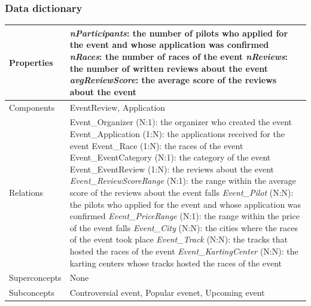 \documentclass{beamer}
\begin{document}
\begin{frame}
\frametitle{Data dictionary}
\begin{table}
\tiny
\begin{tabular}{|p{2cm}|p{6cm}|}
\hline
Properties & 
\textit{nParticipants}: the number of pilots who applied for the event and whose application was confirmed\newline
\textit{nRaces}: the number of races of the event \newline
\textit{nReviews}: the number of written reviews about the event \newline
\textit{avgReviewScore}: the average score of the reviews about the event \\
\hline
Components & EventReview, Application \\
\hline
Relations &
Event\_Organizer (N:1): the organizer who created the event \newline
Event\_Application (1:N): the applications received for the event \newline
Event\_Race (1:N): the races of the event \newline
Event\_EventCategory (N:1): the category of the event \newline
Event\_EventReview (1:N): the reviews about the event \newline
\textit{Event\_ReviewScoreRange} (N:1): the range within the average score of the reviews about the event falls \newline
\textit{Event\_Pilot} (N:N): the pilots who applied for the event and whose application was confirmed \newline
\textit{Event\_PriceRange} (N:1): the range within the price of the event falls \newline
\textit{Event\_City} (N:N): the cities where the races of the event took place \newline
\textit{Event\_Track} (N:N): the tracks that hosted the races of the event \newline
\textit{Event\_KartingCenter} (N:N): the karting centers whose tracks hosted the races of the event \\
\hline
Superconcepts & None \\
\hline
Subconcepts & Controversial event, Popular evenet, Upcoming event \\
\hline
\end{tabular}
\end{table}
\end{frame}
\end{document}
